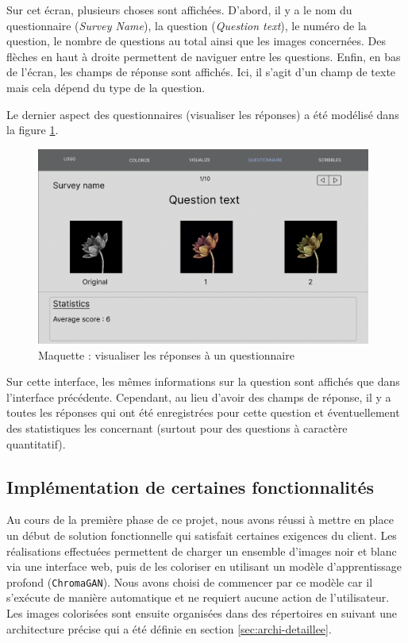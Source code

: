 \documentclass{article}
\begin{document}
Sur cet écran, plusieurs choses sont affichées. D'abord, il y a le nom du questionnaire (\textit{Survey Name}), la question (\textit{Question text}), le numéro de
la question, le nombre de questions au total ainsi que les images concernées. Des flèches en haut à droite permettent de naviguer entre les questions.
Enfin, en bas de l'écran, les champs de réponse sont affichés. Ici, il s'agit d'un champ de texte mais cela dépend du type de la question.

Le dernier aspect des questionnaires (visualiser les réponses) a été modélisé dans la figure \ref{fig:questionnaire-visualiser-reponse}.

\begin{figure}[!ht]
    \centering
    \includegraphics[width=11cm]{questionnaire-visualiser-reponse.png}
    \caption{Maquette : visualiser les réponses à un questionnaire}
    \label{fig:questionnaire-visualiser-reponse}
\end{figure}

Sur cette interface, les mêmes informations sur la question sont affichés que dans l'interface précédente. Cependant,
au lieu d'avoir des champs de réponse, il y a toutes les réponses qui ont été enregistrées pour cette question et éventuellement des statistiques les concernant 
(surtout pour des questions à caractère quantitatif).

\subsection{Implémentation de certaines fonctionnalités} \label{implementation-code}
Au cours de la première phase de ce projet, nous avons réussi à mettre en place un début de solution fonctionnelle qui satisfait certaines exigences du client. Les réalisations effectuées permettent de charger un ensemble 
d'images noir et blanc via une interface web, puis de les coloriser en utilisant un modèle 
d'apprentissage profond (\texttt{ChromaGAN}). Nous avons choisi de commencer par ce modèle car il s'exécute de manière automatique
et ne requiert aucune action de l'utilisateur. Les images colorisées sont ensuite organisées dans des répertoires en suivant une architecture précise qui a été définie en section \ref{sec:archi-detaillee}.
\end{document}
